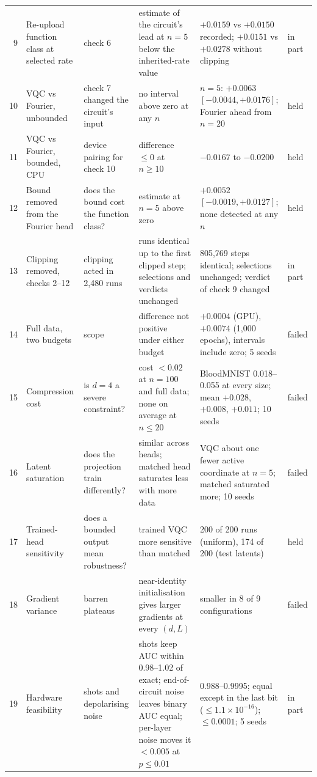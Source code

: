 \documentclass{ieeeaccess}
\newcommand{\vqc}{VQC}
\begin{document}
\begin{table}[t]
\begin{tabular}{@{}rL{2.9cm}L{3.0cm}L{4.1cm}L{4.2cm}l@{}}
9 & Re-upload function class at selected rate & check 6 & estimate of the circuit's lead at $n=5$ below the inherited-rate value & $+0.0159$ vs $+0.0150$ recorded; $+0.0151$ vs $+0.0278$ without clipping & in part\\
10 & \vqc{} vs Fourier, unbounded & check 7 changed the circuit's input & no interval above zero at any $n$ & $n=5$: $+0.0063$ $[-0.0044,+0.0176]$; Fourier ahead from $n=20$ & held\\
11 & \vqc{} vs Fourier, bounded, CPU & device pairing for check 10 & difference $\le0$ at $n\ge10$ & $-0.0167$ to $-0.0200$ & held\\
12 & Bound removed from the Fourier head & does the bound cost the function class? & estimate at $n=5$ above zero & $+0.0052$ $[-0.0019,+0.0127]$; none detected at any $n$ & held\\
13 & Clipping removed, checks 2--12 & clipping acted in 2,480 runs & runs identical up to the first clipped step; selections and verdicts unchanged & 805,769 steps identical; selections unchanged; verdict of check 9 changed & in part\\
14 & Full data, two budgets & scope & difference not positive under either budget & $+0.0004$ (GPU), $+0.0074$ (1,000 epochs), intervals include zero; 5 seeds & failed\\
15 & Compression cost & is $d=4$ a severe constraint? & cost $<0.02$ at $n=100$ and full data; none on average at $n\le20$ & BloodMNIST 0.018--0.055 at every size; mean $+0.028$, $+0.008$, $+0.011$; 10 seeds & failed\\
16 & Latent saturation & does the projection train differently? & similar across heads; matched head saturates less with more data & \vqc{} about one fewer active coordinate at $n=5$; matched saturated more; 10 seeds & failed\\
17 & Trained-head sensitivity & does a bounded output mean robustness? & trained \vqc{} more sensitive than matched & 200 of 200 runs (uniform), 174 of 200 (test latents) & held\\
18 & Gradient variance & barren plateaus & near-identity initialisation gives larger gradients at every $(d,L)$ & smaller in 8 of 9 configurations & failed\\
19 & Hardware feasibility & shots and depolarising noise & shots keep AUC within 0.98--1.02 of exact; end-of-circuit noise leaves binary AUC equal; per-layer noise moves it $<0.005$ at $p\le0.01$ & 0.988--0.9995; equal except in the last bit ($\le1.1\times10^{-16}$); $\le0.0001$; 5 seeds & in part\\
\bottomrule
\end{tabular}
\end{table}
\end{document}
